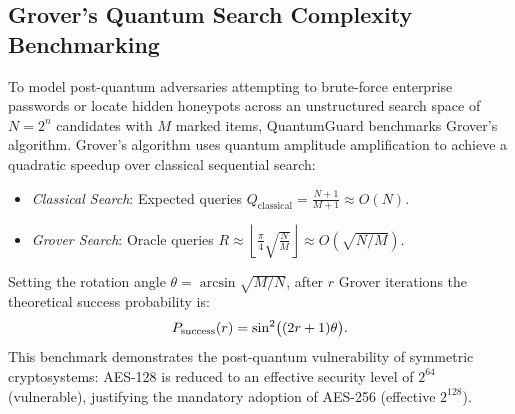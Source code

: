\documentclass[journal,10pt]{IEEEtran}
\makeatletter
\let\orig@label\label
\def\label#1{%
  \orig@label{#1}%
  \pdfdest name{ref.#1} fith\relax
}
\makeatother
\begin{document}
\subsection{Grover's Quantum Search Complexity Benchmarking}
To model post-quantum adversaries attempting to brute-force enterprise passwords or locate hidden honeypots across an unstructured search space of $N = 2^n$ candidates with $M$ marked items, QuantumGuard benchmarks Grover's algorithm. Grover's algorithm uses quantum amplitude amplification to achieve a quadratic speedup over classical sequential search:
\begin{itemize}
    \item \emph{Classical Search}: Expected queries $Q_{\mathrm{classical}} = \frac{N+1}{M+1} \approx O(N)$.
    \item \emph{Grover Search}: Oracle queries $R \approx \left\lfloor \frac{\pi}{4}\sqrt{\frac{N}{M}} \right\rfloor \approx O(\sqrt{N/M})$.
\end{itemize}
Setting the rotation angle $\theta = \arcsin\sqrt{M/N}$, after $r$ Grover iterations the theoretical success probability is:
\begin{equation}
  P_{\mathrm{success}}(r) = \sin^2\bigl((2r + 1)\theta\bigr).
  \label{eq:grover_prob}
\end{equation}
This benchmark demonstrates the post-quantum vulnerability of symmetric cryptosystems: AES-128 is reduced to an effective security level of $2^{64}$ (vulnerable), justifying the mandatory adoption of AES-256 (effective $2^{128}$).
\end{document}
